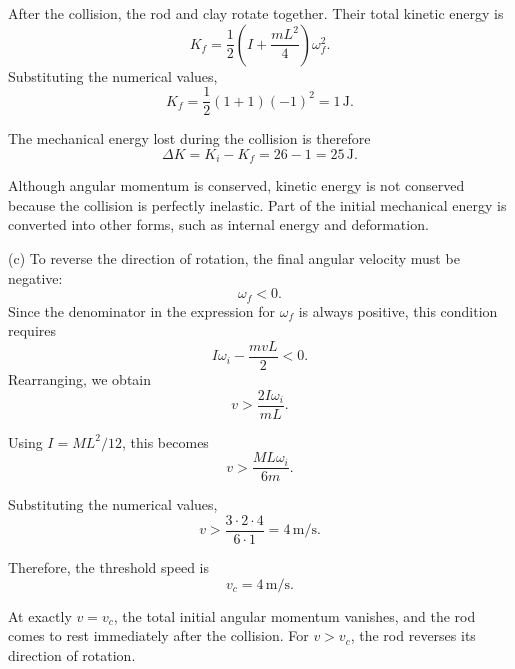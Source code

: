 \documentclass[../main.tex]{subfiles}
\begin{document}
After the collision, the rod and clay rotate
together. Their total kinetic energy is
\begin{equation}
    K_f = \frac{1}{2}
    \left(I+\frac{mL^2}{4}\right)\omega_f^2.
\end{equation}
Substituting the numerical values,
\begin{equation}
    K_f = \frac{1}{2}(1+1)(-1)^2
    = 1\,\mathrm{J}.
\end{equation}

The mechanical energy lost during the collision is
therefore
\begin{equation}
    \Delta K = K_i-K_f
    = 26-1
    = \boxed{25\,\mathrm{J}}.
\end{equation}

Although angular momentum is conserved, kinetic
energy is not conserved because the collision is
perfectly inelastic. Part of the initial mechanical
energy is converted into other forms, such as
internal energy and deformation.


(c) To reverse the direction of rotation, the final
angular velocity must be negative:
\begin{equation}
    \omega_f < 0.
\end{equation}
Since the denominator in the expression for
$\omega_f$ is always positive, this condition
requires
\begin{equation}
    I\omega_i-\frac{mvL}{2}<0.
\end{equation}
Rearranging, we obtain
\begin{equation}
    v>\frac{2I\omega_i}{mL}.
\end{equation}

Using $I=ML^2/12$, this becomes
\begin{equation}
    v>\frac{ML\omega_i}{6m}.
\end{equation}

Substituting the numerical values,
\begin{equation}
    v>\frac{3\cdot 2\cdot 4}{6\cdot 1}
    = 4\,\mathrm{m/s}.
\end{equation}

Therefore, the threshold speed is
\begin{equation}
    \boxed{v_c=4\,\mathrm{m/s}}.
\end{equation}

At exactly $v=v_c$, the total initial angular
momentum vanishes, and the rod comes to rest
immediately after the collision. For $v>v_c$,
the rod reverses its direction of rotation.
\end{document}

